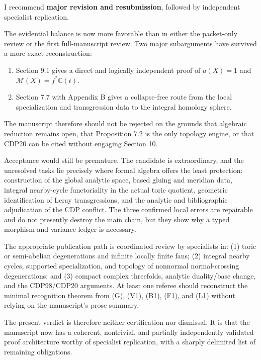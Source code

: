 \documentclass[
  10pt,
  letterpaper,
]{article}
\providecommand{\tightlist}{%
  \setlength{\itemsep}{0pt}\setlength{\parskip}{0pt}}
\begin{document}
I recommend \textbf{major revision and resubmission}, followed by
independent specialist replication.

The evidential balance is now more favorable than in either the
packet-only review or the first full-manuscript review. Two major
subarguments have survived a more exact reconstruction:

\begin{enumerate}
\def\labelenumi{\arabic{enumi}.}
\tightlist
\item
  Section 9.1 gives a direct and logically independent proof of
  \(a(X)=1\) and \(\mathcal M(X)=f^*\mathbb C(t)\).
\item
  Section 7.7 with Appendix B gives a collapse-free route from the local
  specialization and transgression data to the integral homology sphere.
\end{enumerate}

The manuscript therefore should not be rejected on the grounds that
algebraic reduction remains open, that Proposition 7.2 is the only
topology engine, or that CDP20 can be cited without engaging Section 10.

Acceptance would still be premature. The candidate is extraordinary, and
the unresolved tasks lie precisely where formal algebra offers the least
protection: construction of the global analytic space, based gluing and
meridian data, integral nearby-cycle functoriality in the actual toric
quotient, geometric identification of Leray transgressions, and the
analytic and bibliographic adjudication of the CDP conflict. The three
confirmed local errors are repairable and do not presently destroy the
main chain, but they show why a typed morphism and variance ledger is
necessary.

The appropriate publication path is coordinated review by specialists
in: (1) toric or semi-abelian degenerations and infinite locally finite
fans; (2) integral nearby cycles, supported specialization, and topology
of nonnormal normal-crossing degenerations; and (3) compact complex
threefolds, analytic duality/base change, and the CDP98/CDP20 arguments.
At least one referee should reconstruct the minimal recognition theorem
from (G), (V1), (B1), (F1), and (L1) without relying on the manuscript's
prose summary.

The present verdict is therefore neither certification nor dismissal. It
is that the manuscript now has a coherent, nontrivial, and partially
independently validated proof architecture worthy of specialist
replication, with a sharply delimited list of remaining obligations.
\end{document}
